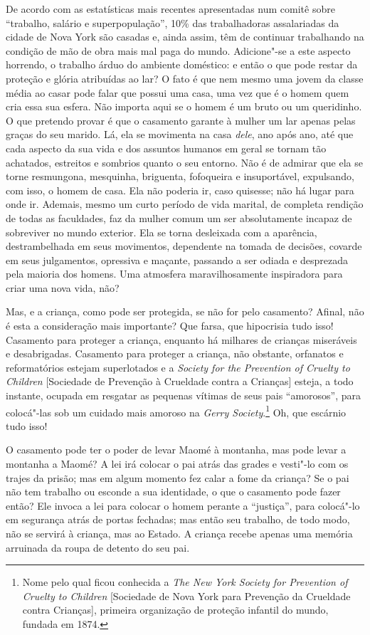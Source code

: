 De acordo com as estatísticas mais recentes apresentadas num comitê
sobre ``trabalho, salário e superpopulação'', 10\% das trabalhadoras
assalariadas da cidade de Nova York são casadas e, ainda assim, têm de
continuar trabalhando na condição de mão de obra mais mal paga do mundo.
Adicione"-se a este aspecto horrendo, o trabalho árduo do ambiente
doméstico: e então o que pode restar da proteção e glória atribuídas ao
lar? O fato é que nem mesmo uma jovem da classe média ao casar pode
falar que possui uma casa, uma vez que é o homem quem cria essa sua
esfera. Não importa aqui se o homem é um bruto ou um queridinho. O que
pretendo provar é que o casamento garante à mulher um lar apenas pelas
graças do seu marido. Lá, ela se movimenta na casa \emph{dele}, ano após
ano, até que cada aspecto da sua vida e dos assuntos humanos em geral se
tornam tão achatados, estreitos e sombrios quanto o seu entorno. Não é de admirar que ela se torne resmungona, mesquinha,
briguenta, fofoqueira e insuportável, expulsando, com isso, o homem de
casa. Ela não poderia ir, caso quisesse; não há lugar para onde ir.
Ademais, mesmo um curto período de vida marital, de completa rendição de
todas as faculdades, faz da mulher comum um ser absolutamente incapaz de
sobreviver no mundo exterior. Ela se torna desleixada com a aparência,
destrambelhada em seus movimentos, dependente na tomada de decisões,
covarde em seus julgamentos, opressiva e maçante, passando a ser odiada
e desprezada pela maioria dos homens. Uma atmosfera maravilhosamente
inspiradora para criar uma nova vida, não?

Mas, e a criança, como pode ser protegida, se não for pelo casamento?
Afinal, não é esta a consideração mais importante? Que farsa, que
hipocrisia tudo isso! Casamento para proteger a criança, enquanto há
milhares de crianças miseráveis e desabrigadas. Casamento para proteger
a criança, não obstante, orfanatos e reformatórios estejam superlotados
e a \emph{Society for the Prevention of Cruelty to Children} {[}Sociedade de Prevenção à Crueldade contra a Crianças{]} esteja, a todo instante,
ocupada em resgatar as pequenas vítimas de seus pais ``amorosos'', para
colocá"-las sob um cuidado mais amoroso na \emph{Gerry
Society}.\footnote{Nome pelo qual ficou conhecida a \textit{The New York Society for Prevention of Cruelty to Children} {[}Sociedade de Nova York para Prevenção da Crueldade contra Crianças{]}, primeira organização de proteção infantil do mundo, fundada em 1874.} Oh, que escárnio tudo isso!

O casamento pode ter o poder de levar Maomé à montanha, mas pode levar a
montanha a Maomé? A lei irá colocar o pai atrás das grades e
vesti"-lo com os trajes da prisão; mas em algum momento fez calar a fome
da criança? Se o pai não tem trabalho ou esconde a sua identidade, o que
o casamento pode fazer então? Ele invoca a lei para colocar o homem perante a
``justiça'', para colocá"-lo em segurança atrás de portas fechadas; mas
então seu trabalho, de todo modo, não se servirá à criança, mas ao
Estado. A criança recebe apenas uma memória arruinada da roupa de
detento do seu pai.

